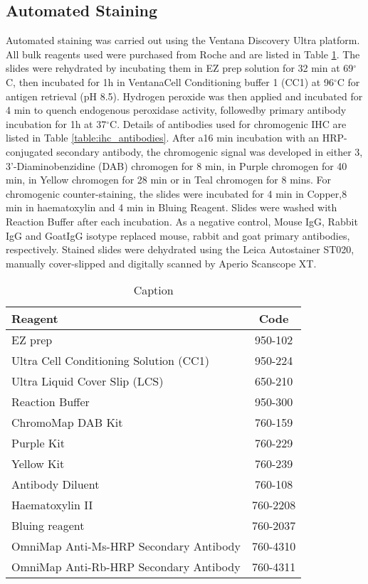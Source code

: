 \subsection{Automated Staining}
Automated staining was carried out using the Ventana Discovery Ultra platform.  All bulk reagents used were purchased from Roche and are listed in Table \ref{table:bulk_reagents}. The slides were rehydrated by incubating them in EZ prep solution for 32 min at 69${^\circ}$C, then incubated for 1h in VentanaCell Conditioning buffer 1 (CC1) at 96${^\circ}$C for antigen retrieval (pH 8.5). Hydrogen peroxide was then applied and incubated for 4 min to quench endogenous peroxidase activity, followedby primary antibody incubation for 1h at 37${^\circ}$C. Details of antibodies used for chromogenic IHC are listed in Table \ref{table:ihc_antibodies}.  After a16 min incubation with an HRP-conjugated secondary antibody, the chromogenic signal was developed in either 3, 3’-Diaminobenzidine (DAB) chromogen for 8 min, in Purple chromogen for 40 min, in Yellow chromogen for 28 min or in Teal chromogen for 8 mins. For chromogenic counter-staining, the slides were incubated for 4 min in Copper,8 min in haematoxylin and 4 min in Bluing Reagent. Slides were washed with Reaction Buffer after each incubation. As a negative control, Mouse IgG, Rabbit IgG and GoatIgG isotype replaced mouse, rabbit and goat primary antibodies, respectively. Stained slides were dehydrated using the Leica Autostainer ST020, manually cover-slipped and digitally scanned by Aperio Scanscope XT. 
\begin{table}[]
    \centering
    \begin{tabular}{lc}
    \hline
    Reagent & Code \\
    \hline
    EZ prep & 950-102 \\
    Ultra Cell Conditioning Solution (CC1) & 950-224\\
    Ultra Liquid Cover Slip (LCS) & 650-210 \\
    Reaction Buffer & 950-300 \\
    ChromoMap DAB Kit & 760-159\\
    Purple Kit & 760-229 \\
    Yellow Kit & 760-239 \\
    Antibody Diluent & 760-108\\
    Haematoxylin II & 760-2208\\
    Bluing reagent & 760-2037\\
    OmniMap Anti-Ms-HRP Secondary Antibody    & 760-4310\\
    OmniMap Anti-Rb-HRP Secondary Antibody & 760-4311 \\
    \hline
    \end{tabular}
    \caption{Caption}
    \label{table:bulk_reagents}
\end{table}

